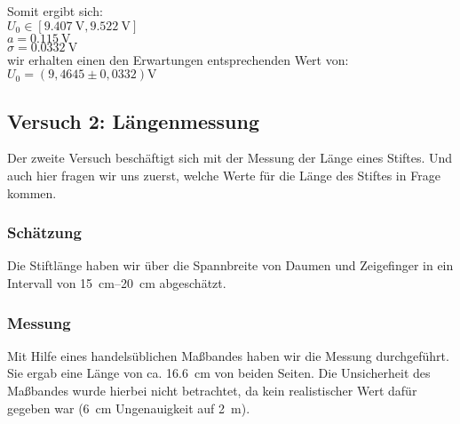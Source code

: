 \documentclass[11pt,a4paper,titlepage, ngerman]{article}
\begin{document}
				\vfill
				\begin{flushleft}
					
					Somit ergibt sich:\\
					
					\vspace{0.5cm}
					$U_0 \in [\SI{9.407}{\V},\SI{9.522}{\V}]$\\
					$a = \SI{0.115}{\V}$ \\
					$\sigma = \SI{0,0332}{\V}$ \\
					\vspace{0.5cm}
					wir erhalten einen den Erwartungen entsprechenden Wert von: \\ 
					\vspace{0.5cm}
					$U_0 = (9,4645 \pm 0,0332)\si{\V}$\\ 
					
				\end{flushleft}
	
		\newpage
		\subsection{Versuch 2: Längenmessung}
			\label{2.2}
			
			Der zweite Versuch beschäftigt sich mit der Messung der Länge eines Stiftes. Und auch hier fragen wir uns zuerst, welche Werte für die Länge des Stiftes in Frage kommen.
		
			\subsubsection{Schätzung}
				\label{2.2.1}
				
				Die Stiftlänge haben wir über die Spannbreite von Daumen und Zeigefinger in ein Intervall von \SIrange{15}{20}{\cm} abgeschätzt.
				
			\subsubsection{Messung}
				\label{2.2.2}
				
				Mit Hilfe eines handelsüblichen Maßbandes haben wir die Messung durchgeführt. Sie ergab eine Länge von ca. \SI{16,6}{\cm} von beiden Seiten. Die Unsicherheit des Maßbandes wurde hierbei nicht betrachtet, da kein realistischer Wert dafür gegeben war (\SI{6}{\cm} Ungenauigkeit auf \SI{2}{\m}).
			
\end{document}
